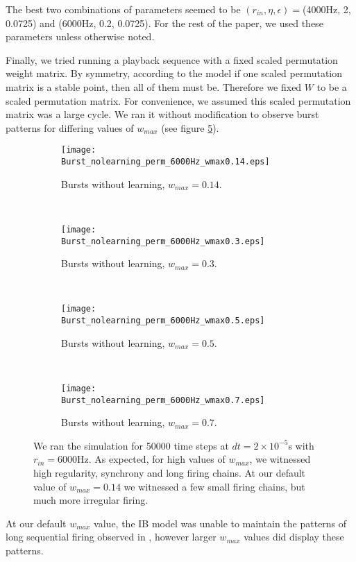 The best two combinations of parameters seemed to be \((r_{in},\eta,\epsilon) = \)(4000Hz, 2, 0.0725) and (6000Hz, 0.2, 0.0725). For the rest of the paper, we used these parameters unless otherwise noted.

Finally, we tried running a playback sequence with a fixed scaled permutation weight matrix. By symmetry, according to the model if one scaled permutation matrix is a stable point, then all of them must be. Therefore we fixed \(W\) to be a scaled permutation matrix. For convenience, we assumed this scaled permutation matrix was a large cycle. We ran it without modification to observe burst patterns for differing values of \(w_{max}\) (see figure \ref{Burst_no_learning}).

\begin{figure}[H]
\centering
\begin{subfigure}[b]{0.49\textwidth}
\texttt{[image: Burst\_nolearning\_perm\_6000Hz\_wmax0.14.eps]}
\caption{Bursts without learning, \(w_{max} = 0.14\).}
\label{Burst_no_learning: 0.14}
\end{subfigure}
\,
\begin{subfigure}[b]{0.49\textwidth}
\texttt{[image: Burst\_nolearning\_perm\_6000Hz\_wmax0.3.eps]}
\caption{Bursts without learning, \(w_{max} = 0.3\).}
\label{Burst_no_learning: 0.3}
\end{subfigure}
\\
\begin{subfigure}[b]{0.49\textwidth}
\texttt{[image: Burst\_nolearning\_perm\_6000Hz\_wmax0.5.eps]}
\caption{Bursts without learning, \(w_{max} = 0.5\).}
\label{Burst_no_learning: 0.5}
\end{subfigure}
\,
\begin{subfigure}[b]{0.49\textwidth}
\texttt{[image: Burst\_nolearning\_perm\_6000Hz\_wmax0.7.eps]}
\caption{Bursts without learning, \(w_{max} = 0.7\).}
\label{Burst_no_learning: 0.7}
\end{subfigure}
\caption{We ran the simulation for 50000 time steps at \(dt = 2\times 10^{-5}\)s with \(r_{in} = 6000\)Hz. As expected, for high values of \(w_{max}\), we witnessed high regularity, synchrony and long firing chains. At our default value of \(w_{max} = 0.14\) we witnessed a few small firing chains, but much more irregular firing.}
\label{Burst_no_learning}
\end{figure}

At our default \(w_{max}\) value, the IB model was unable to maintain the patterns of long sequential firing observed in \cite{Fiete}, however larger \(w_{max}\) values did display these patterns.

